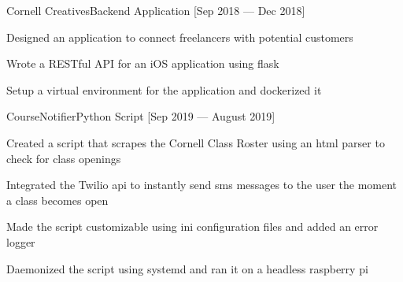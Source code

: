 \documentclass{resume}
\begin{document}
\begin{projects}
    \begin{entry}{Cornell Creatives}{}{Backend Application [Sep 2018 --- Dec
        2018]}
        \begin{description}
            \item Designed an application to connect freelancers with potential
                customers
            \item Wrote a RESTful API for an iOS application using flask
            \item Setup a virtual environment for the application and dockerized
                it
        \end{description}
    \end{entry}


    \begin{entry}{CourseNotifier}{}{Python Script [Sep 2019 --- August 2019]}
        \begin{description}
            \item Created a script that scrapes the Cornell Class Roster
                using an html parser to check for class openings
            \item Integrated the Twilio api to instantly send sms messages to
                the user the moment a class becomes open
            \item Made the script customizable using ini configuration files and
                added an error logger
            \item Daemonized the script using systemd and ran it on a headless
                raspberry pi
        \end{description}
    \end{entry}

\end{projects}
\end{document}
